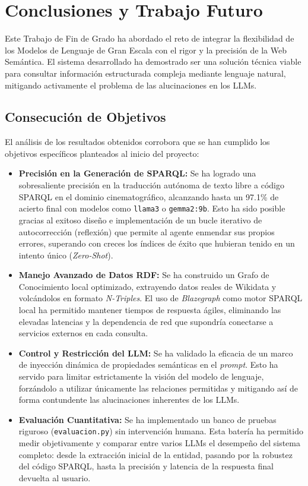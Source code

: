 
\chapter{Conclusiones y Trabajo Futuro}
\label{cap:conclusiones}

Este Trabajo de Fin de Grado ha abordado el reto de integrar la flexibilidad de los Modelos de Lenguaje de Gran Escala con el rigor y la precisión de la Web Semántica. El sistema desarrollado ha demostrado ser una solución técnica viable para consultar información estructurada compleja mediante lenguaje natural, mitigando activamente el problema de las alucinaciones en los LLMs.

\section{Consecución de Objetivos}

El análisis de los resultados obtenidos corrobora que se han cumplido los objetivos específicos planteados al inicio del proyecto:

\begin{itemize}
    \item \textbf{Precisión en la Generación de SPARQL:} Se ha logrado una sobresaliente precisión en la traducción autónoma de texto libre a código SPARQL en el dominio cinematográfico, alcanzando hasta un 97.1\% de acierto final con modelos como \texttt{llama3} o \texttt{gemma2:9b}. Esto ha sido posible gracias al exitoso diseño e implementación de un bucle iterativo de autocorrección (reflexión) que permite al agente enmendar sus propios errores, superando con creces los índices de éxito que hubieran tenido en un intento único (\textit{Zero-Shot}).
    \item \textbf{Manejo Avanzado de Datos RDF:} Se ha construido un Grafo de Conocimiento local optimizado, extrayendo datos reales de Wikidata y volcándolos en formato \textit{N-Triples}. El uso de \textit{Blazegraph} como motor SPARQL local ha permitido mantener tiempos de respuesta ágiles, eliminando las elevadas latencias y la dependencia de red que supondría conectarse a servicios externos en cada consulta.
    \item \textbf{Control y Restricción del LLM:} Se ha validado la eficacia de un marco de inyección dinámica de propiedades semánticas en el \textit{prompt}. Esto ha servido para limitar estrictamente la visión del modelo de lenguaje, forzándolo a utilizar únicamente las relaciones permitidas y mitigando así de forma contundente las alucinaciones inherentes de los LLMs.
    \item \textbf{Evaluación Cuantitativa:} Se ha implementado un banco de pruebas riguroso (\texttt{evaluacion.py}) sin intervención humana. Esta batería ha permitido medir objetivamente y comparar entre varios LLMs el desempeño del sistema completo: desde la extracción inicial de la entidad, pasando por la robustez del código SPARQL, hasta la precisión y latencia de la respuesta final devuelta al usuario.
\end{itemize}

